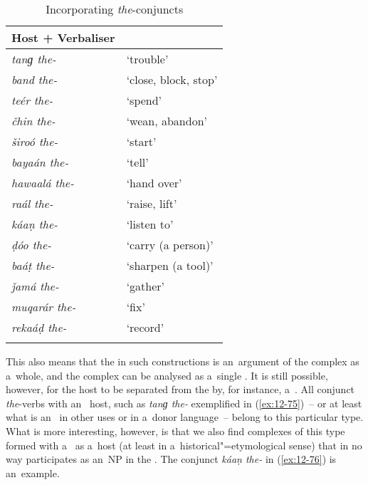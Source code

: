 \begin{exe}
\begin{table}[ht]
\caption{Incorporating \textit{the}-conjuncts}
\begin{tabularx}{.75\textwidth}{ l@{\hspace{45pt}} Q }
\lsptoprule
Host + Verbaliser &
\\\midrule
\textit{tanɡ the-} &
`trouble'\\
\textit{band the-} &
`close, block, stop'\\
\textit{teér the-} &
`spend'\\
\textit{čhin the-} &
`wean, abandon'\\
\textit{široó the-} &
`start'\\
\textit{bayaán the-} &
`tell'\\
\textit{hawaalá the-} &
`hand over'\\
\textit{raál the-} &
`raise, lift'\\
\textit{káaṇ the-} &
`listen to'\\
\textit{ḍóo the-} &
`carry (a person)'\\
\textit{baáṭ the-} &
`sharpen (a tool)'\\
\textit{ǰamá the-} &
`gather'\\
\textit{muqarár the-} &
`fix'\\
\textit{rekaáḍ the-} &
`record'\\\lspbottomrule
\end{tabularx}
\label{tab:12-3}
\end{table}


This also means that the  in such constructions is an~argument of the complex as a~whole, and the complex can be analysed as a~single . It is still possible, however, for the host to be separated from the  by, for instance, a~. All conjunct \textit{the}-verbs with an~ host, such as \textit{tanɡ the-} exemplified in (\ref{ex:12-75})~-- or at least what is an~ in other uses or in a~donor language~-- belong to this particular type. What is more interesting, however, is that we also find complexes of this type formed with a~ as a~host (at least in a~historical"=etymological sense) that in no way participates as an~NP in the . The conjunct \textit{káaṇ the-} in (\ref{ex:12-76}) is an~example. 


\noindent
{}


\end{exe}
